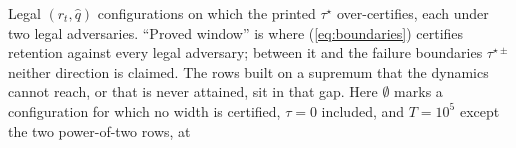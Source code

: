 \begin{table}[!ht]
\centering
\scriptsize
\setlength{\tabcolsep}{3.1pt}
\renewcommand{\arraystretch}{0.95}
\caption{Legal $(r_t,\hat{q})$ configurations on which the printed $\tau^{\star}$ over-certifies,
each under two legal adversaries. ``Proved window'' is where (\ref{eq:boundaries}) certifies
retention against every legal adversary; between it and the failure boundaries
$\tau^{\star\pm}$ neither direction is claimed. The rows built on a supremum that the dynamics
cannot reach, or that is never attained, sit in that gap. Here $\emptyset$ marks a configuration for which no
width is certified, $\tau = 0$ included, and $T = 10^5$ except the two power-of-two rows, at
}
\end{table}
